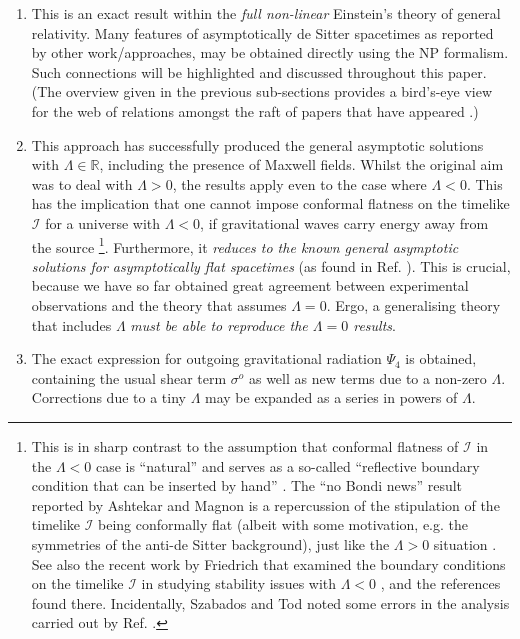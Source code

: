 \documentclass[aps,pre,preprint,superscriptaddress,showpacs,showkeys]{revtex4-1}
\newcommand{\R}{{\mathbb R}}
\begin{document}
\begin{enumerate}
\item This is an exact result within the \emph{full non-linear} Einstein's theory of general relativity. Many features of asymptotically de Sitter spacetimes as reported by other work/approaches, may be obtained directly using the NP formalism. Such connections will be highlighted and discussed throughout this paper. (The overview given in the previous sub-sections provides a bird's-eye view for the web of relations amongst the raft of papers that have appeared \cite{Vee2016,Vee2017,Vee2017b,Vee2017c,Szabados,Chrusciel,chi1,chi2,ash1,ash2,ash3,ash4,gracos1,gracos2,Zhang}.)
\item This approach has successfully produced the general asymptotic solutions with $\Lambda\in\R$, including the presence of Maxwell fields. Whilst the original aim was to deal with $\Lambda>0$, the results apply even to the case where $\Lambda<0$. This has the implication that one cannot impose conformal flatness on the timelike $\mathcal{I}$ for a universe with $\Lambda<0$, if gravitational waves carry energy away from the source \footnote{This is in sharp contrast to the assumption that conformal flatness of $\mathcal{I}$ in the $\Lambda<0$ case is ``natural'' and serves as a so-called ``reflective boundary condition that can be inserted by hand'' \cite{ash1,ashmag,haw83,reflect1,reflect2}. The ``no Bondi news'' result reported by Ashtekar and Magnon \cite{ashmag} is a repercussion of the stipulation of the timelike $\mathcal{I}$ being conformally flat (albeit with some motivation, e.g. the symmetries of the anti-de Sitter background), just like the $\Lambda>0$ situation \cite{ash1}. See also the recent work by Friedrich that examined the boundary conditions on the timelike $\mathcal{I}$ in studying stability issues with $\Lambda<0$ \cite{Friedrich2014}, and the references found there. Incidentally, Szabados and Tod noted some errors in the analysis carried out by Ref. \cite{ashmag}.}. Furthermore, it \emph{reduces to the known general asymptotic solutions for asymptotically flat spacetimes} (as found in Ref. \cite{Pen88}). This is crucial, because we have so far obtained great agreement between experimental observations and the theory that assumes $\Lambda=0$. Ergo, a generalising theory that includes $\Lambda$ \emph{must be able to reproduce the $\Lambda=0$ results}.
\item The exact expression for outgoing gravitational radiation $\Psi_4$ is obtained, containing the usual shear term $\sigma^o$ as well as new terms due to a non-zero $\Lambda$. Corrections due to a tiny $\Lambda$ may be expanded as a series in powers of $\Lambda$.

\end{enumerate}
\end{document}

